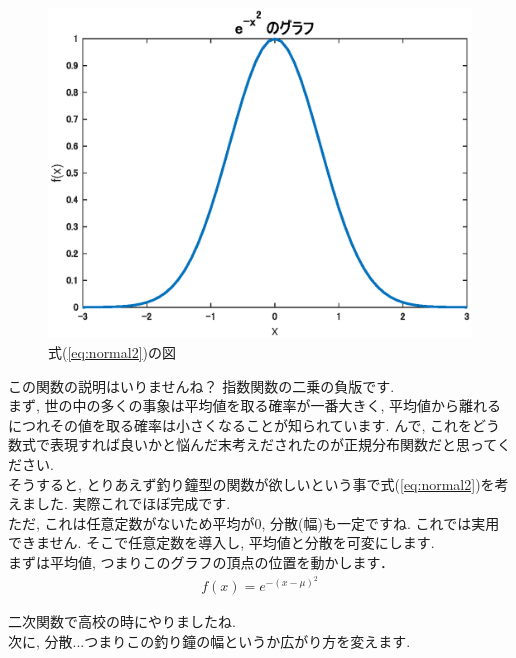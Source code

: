\documentclass[11pt,a4paper]{ujreport} 	%
\begin{document}
\begin{figure}[H]
\label{im:normal2}
  \centering
  \includegraphics[width=120mm]{../figures/normal2.eps}
  \caption{式(\ref{eq:normal2})の図}
\end{figure}

この関数の説明はいりませんね？ 指数関数の二乗の負版です.\\

まず, 世の中の多くの事象は平均値を取る確率が一番大きく, 平均値から離れるにつれその値を取る確率は小さくなることが知られています. んで, これをどう数式で表現すれば良いかと悩んだ末考えだされたのが正規分布関数だと思ってください.\\

そうすると, とりあえず釣り鐘型の関数が欲しいという事で式(\ref{eq:normal2})を考えました. 実際これでほぼ完成です.\\

ただ, これは任意定数がないため平均が0, 分散(幅)も一定ですね. これでは実用できません. そこで任意定数を導入し, 平均値と分散を可変にします. \\

まずは平均値, つまりこのグラフの頂点の位置を動かします．\\

\begin{align}
\label{eq:normal3}
f(x) = e^{-(x-\mu)^2}
\end{align}

二次関数で高校の時にやりましたね.\\

次に, 分散...つまりこの釣り鐘の幅というか広がり方を変えます. \\
\end{document}
